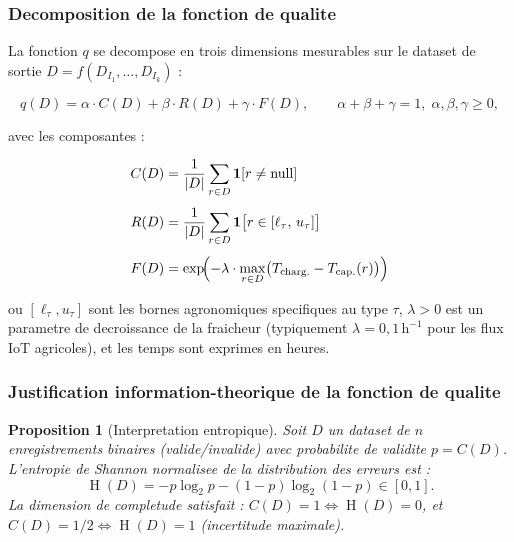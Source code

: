 \documentclass[12pt,a4paper]{article}
\theoremstyle{plain}
\newtheorem{proposition}[theorem]{Proposition}
\theoremstyle{definition}
\theoremstyle{remark}
\DeclareMathOperator{\ent}{H}
\begin{document}
	\subsubsection{Decomposition de la fonction de qualite}
	\label{subsec:quality_func}
	
	La fonction $q$ se decompose en trois dimensions mesurables sur le
	dataset de sortie $D = f(D_{I_1},\ldots,D_{I_k})$ :
	
	\begin{equation}
		q(D) = \alpha \cdot C(D) + \beta \cdot R(D) + \gamma \cdot F(D),
		\qquad \alpha+\beta+\gamma=1,\; \alpha,\beta,\gamma \geq 0,
		\label{eq:qtask}
	\end{equation}
	
	avec les composantes :
	
	\begin{align}
		C(D) &= \frac{1}{|D|}\sum_{r \in D} \mathbf{1}[r \neq \text{null}]
		\label{eq:C}\\[4pt]
		R(D) &= \frac{1}{|D|}\sum_{r \in D}
		\mathbf{1}\bigl[r \in [\ell_\tau,\, u_\tau]\bigr]
		\label{eq:R}\\[4pt]
		F(D) &= \exp\!\Bigl(-\lambda \cdot
		\max_{r \in D}\bigl(T_{\text{charg.}} - T_{\text{cap.}}(r)\bigr)\Bigr)
		\label{eq:F}
	\end{align}
	
	ou $[\ell_\tau, u_\tau]$ sont les bornes agronomiques specifiques au type
	$\tau$, $\lambda > 0$ est un parametre de decroissance de la fraicheur
	(typiquement $\lambda = 0{,}1\,\text{h}^{-1}$ pour les flux IoT
	agricoles), et les temps sont exprimes en heures.
	
	\subsubsection{Justification information-theorique de la fonction de qualite}
	\label{subsec:info_theo}
	
	\begin{proposition}[Interpretation entropique]
		\label{prop:entropy}
		Soit $D$ un dataset de $n$ enregistrements binaires (valide/invalide)
		avec probabilite de validite $p = C(D)$.
		L'entropie de Shannon normalisee de la distribution des erreurs est :
		\[
		\ent(D) = -p\log_2 p - (1-p)\log_2(1-p) \in [0,1].
		\]
		La dimension de completude satisfait :
		$C(D) = 1 \Leftrightarrow \ent(D) = 0$,
		et $C(D) = 1/2 \Leftrightarrow \ent(D) = 1$ (incertitude maximale).
	\end{proposition}
	
\end{document}
